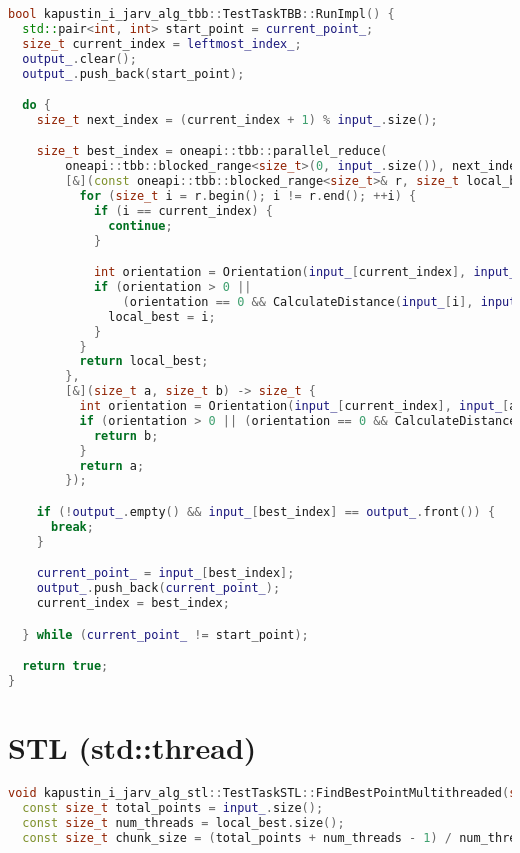 \documentclass[a4paper,12pt]{article}
\begin{document}
\begin{itemize}
\begin{lstlisting}[language=C++]
bool kapustin_i_jarv_alg_tbb::TestTaskTBB::RunImpl() {
  std::pair<int, int> start_point = current_point_;
  size_t current_index = leftmost_index_;
  output_.clear();
  output_.push_back(start_point);

  do {
    size_t next_index = (current_index + 1) % input_.size();

    size_t best_index = oneapi::tbb::parallel_reduce(
        oneapi::tbb::blocked_range<size_t>(0, input_.size()), next_index,
        [&](const oneapi::tbb::blocked_range<size_t>& r, size_t local_best) -> size_t {
          for (size_t i = r.begin(); i != r.end(); ++i) {
            if (i == current_index) {
              continue;
            }

            int orientation = Orientation(input_[current_index], input_[local_best], input_[i]);
            if (orientation > 0 ||
                (orientation == 0 && CalculateDistance(input_[i], input_[current_index]) >CalculateDistance(input_[local_best], input_[current_index]))) {
              local_best = i;
            }
          }
          return local_best;
        },
        [&](size_t a, size_t b) -> size_t {
          int orientation = Orientation(input_[current_index], input_[a], input_[b]);
          if (orientation > 0 || (orientation == 0 && CalculateDistance(input_[b], input_[current_index]) >CalculateDistance(input_[a], input_[current_index]))) {
            return b;
          }
          return a;
        });

    if (!output_.empty() && input_[best_index] == output_.front()) {
      break;
    }

    current_point_ = input_[best_index];
    output_.push_back(current_point_);
    current_index = best_index;

  } while (current_point_ != start_point);

  return true;
}
\end{lstlisting}

\newpage
\section*{STL (std::thread)}

\begin{lstlisting}[language=C++]
void kapustin_i_jarv_alg_stl::TestTaskSTL::FindBestPointMultithreaded(size_t current_index, std::vector<size_t>& local_best) {
  const size_t total_points = input_.size();
  const size_t num_threads = local_best.size();
  const size_t chunk_size = (total_points + num_threads - 1) / num_threads;


\end{lstlisting}
\end{itemize}
\end{document}
